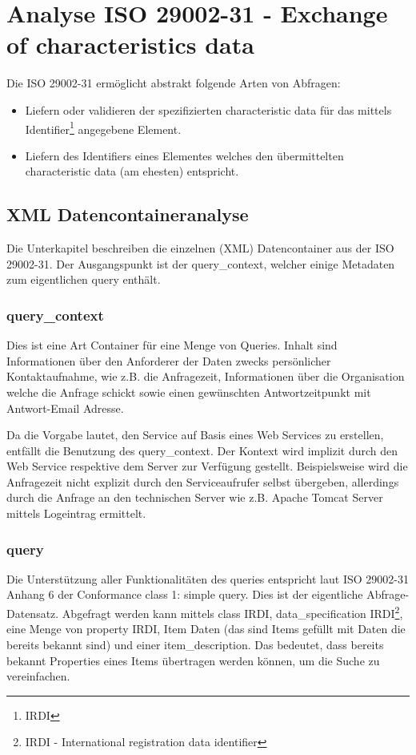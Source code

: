 \section{Analyse ISO 29002-31 - Exchange of characteristics data}

Die ISO 29002-31 ermöglicht abstrakt folgende Arten von Abfragen:
\begin{itemize}
\item Liefern oder validieren der spezifizierten characteristic data für das mittels Identifier\footnote{IRDI} angegebene Element.
\item Liefern des Identifiers eines Elementes welches den übermittelten characteristic data (am ehesten) entspricht. 
\end{itemize}

\subsection{XML Datencontaineranalyse}
Die Unterkapitel beschreiben die einzelnen (XML) Datencontainer aus der ISO 29002-31. Der Ausgangspunkt ist der query\_context, welcher einige Metadaten zum eigentlichen query enthält. 

\subsubsection{query\_context}
Dies ist eine Art Container für eine Menge von Queries. Inhalt sind Informationen über den Anforderer der Daten zwecks persönlicher Kontaktaufnahme, wie z.B. die Anfragezeit, Informationen über die Organisation welche die Anfrage schickt sowie einen gewünschten Antwortzeitpunkt mit Antwort-Email Adresse. 

Da die Vorgabe lautet, den Service auf Basis eines Web Services zu erstellen, entfällt die Benutzung des query\_context. Der Kontext wird implizit durch den Web Service respektive dem Server zur Verfügung gestellt. Beispielsweise wird die Anfragezeit nicht explizit durch den Serviceaufrufer selbst übergeben, allerdings durch die Anfrage an den technischen Server wie z.B. Apache Tomcat Server mittels Logeintrag ermittelt. 

\subsubsection{query}
Die Unterstützung aller Funktionalitäten des queries entspricht laut ISO 29002-31 Anhang 6 der Conformance class 1: simple query.
Dies ist der eigentliche Abfrage-Datensatz. Abgefragt werden kann mittels class IRDI, data\_specification IRDI\footnote{IRDI  - International registration data identifier}, eine Menge von property IRDI, Item Daten (das sind Items gefüllt mit Daten die bereits bekannt sind) und einer item\_description. Das bedeutet, dass bereits bekannt Properties eines Items übertragen werden können, um die Suche zu vereinfachen.

